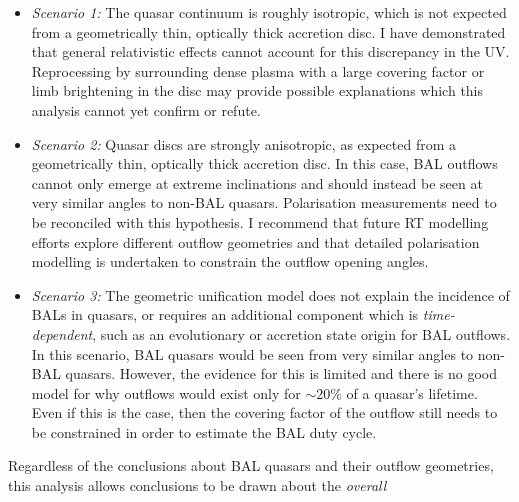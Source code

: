 \begin{itemize}
	\item {\sl Scenario 1:} The quasar continuum is roughly isotropic, which is not 
	expected from a geometrically thin, optically thick accretion disc.
    I have demonstrated that general relativistic effects cannot account for this discrepancy in the 
    UV. Reprocessing by surrounding dense plasma with a large covering factor or limb brightening 
    in the disc may provide possible explanations which this analysis cannot yet confirm or refute.
    \smallskip
	\item {\sl Scenario 2:} Quasar discs are strongly anisotropic, as expected from a 
	geometrically thin, optically thick accretion disc. In this case, BAL outflows cannot 
	only emerge at extreme inclinations and should instead be seen at very similar angles
	to non-BAL quasars. Polarisation measurements need to be reconciled with this hypothesis.
	I recommend that future RT modelling efforts explore different outflow 
	geometries and that detailed polarisation modelling is undertaken to constrain the 
	outflow opening angles.
	\smallskip
	\item  {\sl Scenario 3:} The geometric unification model does not explain the incidence of 
	BALs in quasars, or requires an additional component which is {\em time-dependent}, 
	such as an evolutionary or accretion state origin for BAL outflows. In this scenario, 
	BAL quasars would be seen from very similar angles to non-BAL quasars. However, the 
	evidence for this is limited and there is no good model for why outflows would exist 
	only for $\sim 20\%$ of a quasar's lifetime. Even if this is the case, then the covering 
	factor of the outflow still needs to be constrained in order to estimate the BAL duty cycle.
\end{itemize}
Regardless of the conclusions about BAL quasars and their outflow geometries,
this analysis allows conclusions to be drawn about the {\em overall} 
